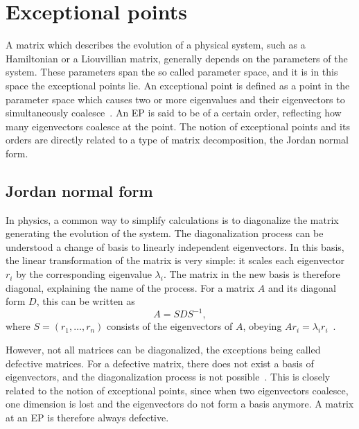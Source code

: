 \documentclass[../main.tex]{subfiles}
\begin{document}

\section{Exceptional points}\label{sec:ep}
A matrix which describes the evolution of a physical system, such as a Hamiltonian or a Liouvillian matrix, generally depends on the parameters of the system. These parameters span the so called parameter space, and it is in this space the exceptional points lie. An exceptional point is defined as a point in the parameter space which causes two or more eigenvalues and their eigenvectors to simultaneously coalesce~\cite{nonHermrev}. An EP is said to be of a certain order, reflecting how many eigenvectors coalesce at the point. The notion of exceptional points and its orders are directly related to a type of matrix decomposition, the Jordan normal form.

\subsection{Jordan normal form}

In physics, a common way to simplify calculations is to diagonalize the matrix generating the evolution of the system. The diagonalization process can be understood a change of basis to linearly independent eigenvectors. In this basis, the linear transformation of the matrix is very simple: it scales each eigenvector $r_i$ by the corresponding eigenvalue $\lambda_i$. The matrix in the new basis is therefore diagonal, explaining the name of the process. For a matrix $A$ and its diagonal form $D$, this can be written as 
\begin{equation}
    A = SDS^{-1},
\end{equation}
where $S = (r_1, \dots ,r_n)$ consists of the eigenvectors of $A$, obeying $Ar_i=\lambda_ir_i$~\cite{uffe}.

However, not all matrices can be diagonalized, the exceptions being called defective matrices. For a defective matrix, there does not exist a basis of eigenvectors, and the diagonalization process is not possible~\cite{uffe}. This is closely related to the notion of exceptional points, since when two eigenvectors coalesce, one dimension is lost and the eigenvectors do not form a basis anymore. A matrix at an EP is therefore always defective.
\end{document}
